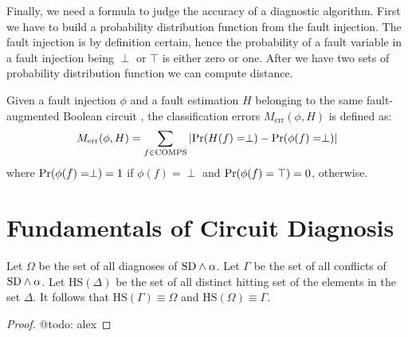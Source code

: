 \documentclass{article}
\begin{document}
Finally, we need a formula to judge the accuracy of a diagnostic
algorithm. First we have to build a probability distribution function
from the fault injection. The fault injection is by definition
certain, hence the probability of a fault variable in a fault
injection being $\perp$ or $\top$ is either zero or one. After we have
two sets of probability distribution function we can compute distance.
%
\begin{definition}
  Given a fault injection $\phi$ and a fault estimation $H$ belonging
  to the same fault-augmented Boolean circuit \sd, the classification
  errors $M_{\textrm{err}}(\phi, H)$ is defined as:
  \begin{eqnarray}
    M_{\textrm{err}}(\phi, H) = \sum_{f \in \mathrm{COMPS}}{\left|\mbox{Pr}(H(f) = \perp) - \mbox{Pr}(\phi(f) = \perp)\right|}
  \end{eqnarray}
  where $\mbox{Pr}(\phi(f) = \perp) = 1$ if $\phi(f) = \perp$ and
  $\mbox{Pr}(\phi(f) = \top) = 0$, otherwise.
\end{definition}
%
\section{Fundamentals of Circuit Diagnosis}
%
\begin{theorem}[de Kleer]
  Let $\Omega$ be the set of all diagnoses of $\mathrm{SD} \wedge \alpha$. Let
  $\Gamma$ be the set of all conflicts of $\mathrm{SD} \wedge \alpha$. Let
  $\mathrm{HS}(\Delta)$ be the set of all distinct hitting set of the
  elements in the set $\Delta$. It follows that $\mathrm{HS}(\Gamma)
  \equiv \Omega$ and $\mathrm{HS}(\Omega) \equiv \Gamma$.
\end{theorem}
\begin{proof}
  @todo: alex
\end{proof}
%
\newpage
\end{document}
